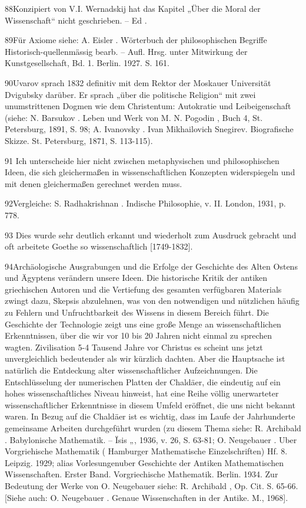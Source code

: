 \documentclass[11pt,a4paper]{book}
\begin{document}
88Konzipiert von V.I. Wernadskij hat das Kapitel „Über die Moral der Wissenschaft“ nicht geschrieben. -- Ed .



89Für Axiome siehe: A. Eisler . Wörterbuch der philosophischen Begriffe Historisch-quellenmässig bearb. -- Aufl. Hrsg. unter Mitwirkung der Kunstgesellschaft, Bd. 1. Berlin. 1927. S. 161.



90Uvarov sprach 1832 definitiv mit dem Rektor der Moskauer Universität Dvigubsky darüber. Er sprach „über die politische Religion“ mit zwei unumstrittenen Dogmen wie dem Christentum: Autokratie und Leibeigenschaft (siehe: N. Barsukov . Leben und Werk von M. N. Pogodin , Buch 4, St. Petersburg, 1891, S. 98; A. Ivanovsky . Ivan Mikhailovich Snegirev. Biografische Skizze. St. Petersburg, 1871, S. 113-115).



91 Ich unterscheide hier nicht zwischen metaphysischen und philosophischen Ideen, die sich gleichermaßen in wissenschaftlichen Konzepten widerspiegeln und mit denen gleichermaßen gerechnet werden muss.



92Vergleiche: S. Radhakrishnan . Indische Philosophie, v. II. London, 1931, p. 778.



93 Dies wurde sehr deutlich erkannt und wiederholt zum Ausdruck gebracht und oft arbeitete Goethe so wissenschaftlich [1749-1832].



94Archäologische Ausgrabungen und die Erfolge der Geschichte des Alten Ostens und Ägyptens verändern unsere Ideen. Die historische Kritik der antiken griechischen Autoren und die Vertiefung des gesamten verfügbaren Materials zwingt dazu, Skepsis abzulehnen, was von den notwendigen und nützlichen häufig zu Fehlern und Unfruchtbarkeit des Wissens in diesem Bereich führt. Die Geschichte der Technologie zeigt uns eine große Menge an wissenschaftlichen Erkenntnissen, über die wir vor 10 bis 20 Jahren nicht einmal zu sprechen wagten. Zivilisation 5-4 Tausend Jahre vor Christus es scheint uns jetzt unvergleichlich bedeutender als wir kürzlich dachten. Aber die Hauptsache ist natürlich die Entdeckung alter wissenschaftlicher Aufzeichnungen. Die Entschlüsselung der numerischen Platten der Chaldäer, die eindeutig auf ein hohes wissenschaftliches Niveau hinweist, hat eine Reihe völlig unerwarteter wissenschaftlicher Erkenntnisse in diesem Umfeld eröffnet, die uns nicht bekannt waren. In Bezug auf die Chaldäer ist es wichtig, dass im Laufe der Jahrhunderte gemeinsame Arbeiten durchgeführt wurden (zu diesem Thema siehe: R. Archibald . Babylonische Mathematik. -- Ïsis „, 1936, v. 26, S. 63-81; O. Neugebauer . Uber Vorgriehische Mathematik ( Hamburger Mathematische Einzelschriften) Hf. 8. Leipzig. 1929; alias Vorlesungenuber Geschichte der Antiken Mathematischen Wissenschaften. Erster Band. Vorgriechische Mathematik. Berlin. 1934. Zur Bedeutung der Werke von O. Neugebauer siehe: R. Archibald , Op. Cit. S. 65-66. [Siehe auch: O. Neugebauer . Genaue Wissenschaften in der Antike. M., 1968].
\end{document}
